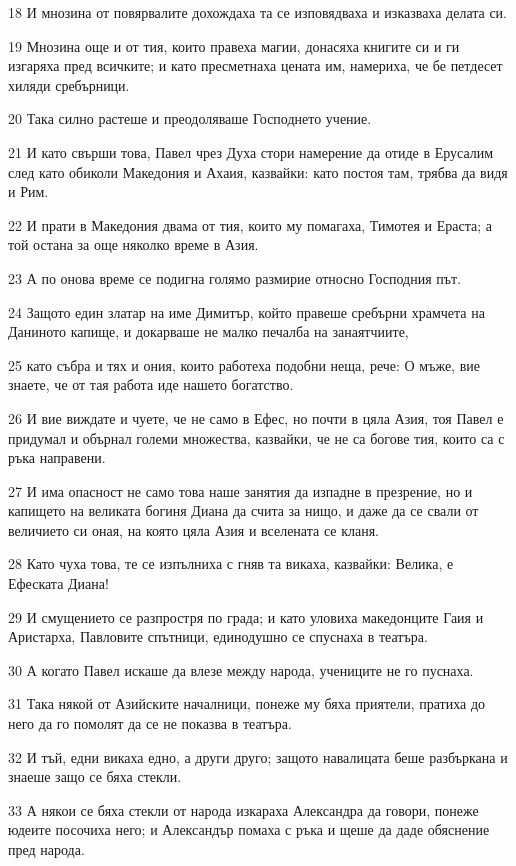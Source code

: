 \par 18 И мнозина от повярвалите дохождаха та се изповядваха и изказваха делата си.
\par 19 Мнозина още и от тия, които правеха магии, донасяха книгите си и ги изгаряха пред всичките; и като пресметнаха цената им, намериха, че бе петдесет хиляди сребърници.
\par 20 Така силно растеше и преодоляваше Господнето учение.
\par 21 И като свърши това, Павел чрез Духа стори намерение да отиде в Ерусалим след като обиколи Македония и Ахаия, казвайки: като постоя там, трябва да видя и Рим.
\par 22 И прати в Македония двама от тия, които му помагаха, Тимотея и Ераста; а той остана за още няколко време в Азия.
\par 23 А по онова време се подигна голямо размирие относно Господния път.
\par 24 Защото един златар на име Димитър, който правеше сребърни храмчета на Даниното капище, и докарваше не малко печалба на занаятчиите,
\par 25 като събра и тях и ония, които работеха подобни неща, рече: О мъже, вие знаете, че от тая работа иде нашето богатство.
\par 26 И вие виждате и чуете, че не само в Ефес, но почти в цяла Азия, тоя Павел е придумал и обърнал големи множества, казвайки, че не са богове тия, които са с ръка направени.
\par 27 И има опасност не само това наше занятия да изпадне в презрение, но и капището на великата богиня Диана да счита за нищо, и даже да се свали от величието си оная, на която цяла Азия и вселената се кланя.
\par 28 Като чуха това, те се изпълниха с гняв та викаха, казвайки: Велика, е Ефеската Диана!
\par 29 И смущението се разпростря по града; и като уловиха македонците Гаия и Аристарха, Павловите спътници, единодушно се спуснаха в театъра.
\par 30 А когато Павел искаше да влезе между народа, учениците не го пуснаха.
\par 31 Така някой от Азийските началници, понеже му бяха приятели, пратиха до него да го помолят да се не показва в театъра.
\par 32 И тъй, едни викаха едно, а други друго; защото навалицата беше разбъркана и знаеше защо се бяха стекли.
\par 33 А някои се бяха стекли от народа изкараха Александра да говори, понеже юдеите посочиха него; и Александър помаха с ръка и щеше да даде обяснение пред народа.

